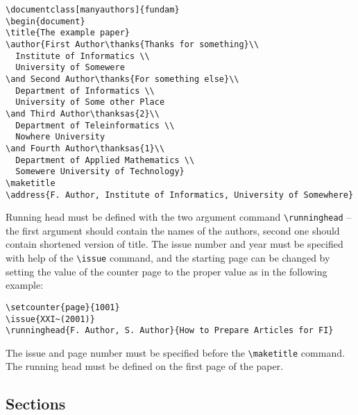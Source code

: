 \documentclass{fundam}
\begin{document}
\begin{verbatim}
\documentclass[manyauthors]{fundam}
\begin{document}
\title{The example paper}
\author{First Author\thanks{Thanks for something}\\
  Institute of Informatics \\
  University of Somewere
\and Second Author\thanks{For something else}\\
  Department of Informatics \\
  University of Some other Place
\and Third Author\thanksas{2}\\
  Department of Teleinformatics \\
  Nowhere University
\and Fourth Author\thanksas{1}\\
  Department of Applied Mathematics \\
  Somewere University of Technology}
\maketitle
\address{F. Author, Institute of Informatics, University of Somewhere}
\end{verbatim}

Running head must be defined with the two argument command
\verb|\runninghead| -- the first argument should contain the names of
the authors, second one should contain shortened version of title.
The issue number and year must be specified with help of the
\verb|\issue| command, and the starting page can be changed by setting
the value of the counter page to the proper value as in the following
example:

\begin{verbatim}
\setcounter{page}{1001}
\issue{XXI~(2001)}
\runninghead{F. Author, S. Author}{How to Prepare Articles for FI}
\end{verbatim}

The issue and page number must be specified before the
\verb|\maketitle| command. The running head must be defined on the
first page of the paper.

\subsection{Sections}
\end{document}
